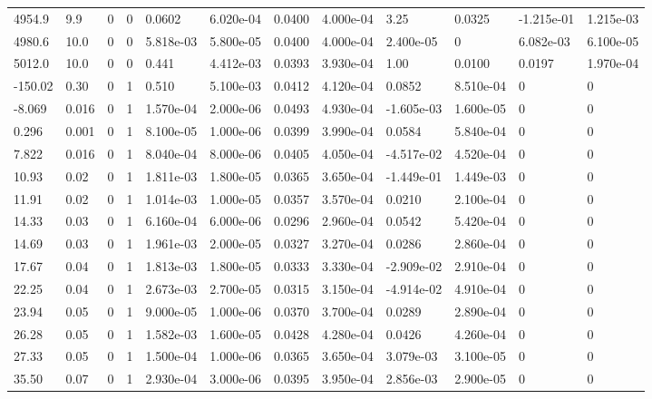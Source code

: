 \documentclass[preview]{standalone}
\begin{document}
{{{{{{{{{{{{\begin{tabular}{L{1.2cm}C{1.2cm} C{0.3cm}C{0.5cm} C{1.4cm}C{1.4cm} C{1.4cm}C{1.4cm} C{1.6cm}C{1.6cm} C{1.6cm}C{1.6cm}}
  4954.9  &   9.9  & 0     &  0 &  0.0602  & 6.020e-04  &  0.0400&   4.000e-04& 3.25 & 0.0325   &  -1.215e-01 & 1.215e-03  \\ 
  4980.6  &  10.0  & 0     &  0 &  5.818e-03  & 5.800e-05  &  0.0400&   4.000e-04& 2.400e-05 & 0   &  6.082e-03 & 6.100e-05  \\ 
  5012.0  &  10.0  & 0     &  0 &  0.441  & 4.412e-03  &  0.0393&   3.930e-04& 1.00 & 0.0100   &  0.0197 & 1.970e-04  \\ 
  -150.02  &  0.30  & 0     &  1 &  0.510  & 5.100e-03  &  0.0412&   4.120e-04& 0.0852 & 8.510e-04   &  0 & 0  \\ 
  -8.069  &  0.016  & 0     &  1 &  1.570e-04  & 2.000e-06  &  0.0493&   4.930e-04& -1.605e-03 & 1.600e-05   &  0 & 0  \\ 
  0.296  &  0.001  & 0     &  1 &  8.100e-05  & 1.000e-06  &  0.0399&   3.990e-04& 0.0584 & 5.840e-04   &  0 & 0  \\ 
  7.822  &  0.016  & 0     &  1 &  8.040e-04  & 8.000e-06  &  0.0405&   4.050e-04& -4.517e-02 & 4.520e-04   &  0 & 0  \\ 
  10.93  &  0.02  & 0     &  1 &  1.811e-03  & 1.800e-05  &  0.0365&   3.650e-04& -1.449e-01 & 1.449e-03   &  0 & 0  \\ 
  11.91  &  0.02  & 0     &  1 &  1.014e-03  & 1.000e-05  &  0.0357&   3.570e-04& 0.0210 & 2.100e-04   &  0 & 0  \\ 
  14.33  &  0.03  & 0     &  1 &  6.160e-04  & 6.000e-06  &  0.0296&   2.960e-04& 0.0542 & 5.420e-04   &  0 & 0  \\ 
  14.69  &  0.03  & 0     &  1 &  1.961e-03  & 2.000e-05  &  0.0327&   3.270e-04& 0.0286 & 2.860e-04   &  0 & 0  \\ 
  17.67  &  0.04  & 0     &  1 &  1.813e-03  & 1.800e-05  &  0.0333&   3.330e-04& -2.909e-02 & 2.910e-04   &  0 & 0  \\ 
  22.25  &  0.04  & 0     &  1 &  2.673e-03  & 2.700e-05  &  0.0315&   3.150e-04& -4.914e-02 & 4.910e-04   &  0 & 0  \\ 
  23.94  &  0.05  & 0     &  1 &  9.000e-05  & 1.000e-06  &  0.0370&   3.700e-04& 0.0289 & 2.890e-04   &  0 & 0  \\ 
  26.28  &  0.05  & 0     &  1 &  1.582e-03  & 1.600e-05  &  0.0428&   4.280e-04& 0.0426 & 4.260e-04   &  0 & 0  \\ 
  27.33  &  0.05  & 0     &  1 &  1.500e-04  & 1.000e-06  &  0.0365&   3.650e-04& 3.079e-03 & 3.100e-05   &  0 & 0  \\ 
  35.50  &  0.07  & 0     &  1 &  2.930e-04  & 3.000e-06  &  0.0395&   3.950e-04& 2.856e-03 & 2.900e-05   &  0 & 0  \\ 
\hline 
\end{tabular} 

}}}}}}}}}}}}
\end{document}
